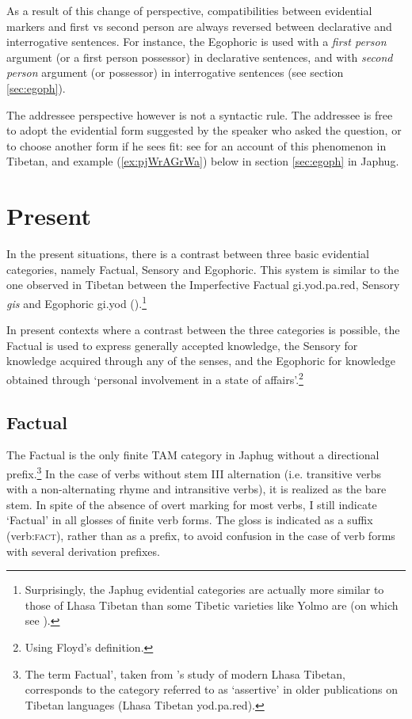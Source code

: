 \documentclass[oldfontcommands,oneside,a4paper,11pt]{article}
\newcommand{\ipa}[1]{{\phon \mbox{#1}}} %
\newcommand{\refb}[1]{(\ref{#1})}
\newcommand{\factual}[1]{\textsc{:fact}}
\begin{document}
As a result of this change of perspective, compatibilities between evidential markers and first vs second person are always reversed between declarative and interrogative sentences. For instance, the Egophoric is used with a \textit{first person} argument (or a first person possessor) in declarative sentences, and with \textit{second person} argument (or possessor) in interrogative sentences (see section \ref{sec:egoph}).

The addressee perspective however is not a syntactic rule. The addressee is free to adopt the evidential form suggested by the speaker who asked the question, or to choose another form if he sees fit: see \citealt{garrett07symbiosis} for an account of this phenomenon in Tibetan, and example
\refb{ex:pjWrAGrWa} below in section \ref{sec:egoph} in Japhug.

\section{Present} \label{sec:evd:prs}
In the present situations, there is a contrast between three basic evidential categories, namely Factual, Sensory and Egophoric. This system is similar to the one observed in Tibetan between the Imperfective Factual \ipa{gi.yod.pa.red}, Sensory \textit{gis} and Egophoric \ipa{gi.yod} (\citealt[295+]{tournadre08conjunct}).\footnote{Surprisingly, the Japhug evidential categories are actually more similar to those of Lhasa Tibetan than some Tibetic varieties like Yolmo are (on which see \citealt{gawne13copulas}).} 

In present contexts where a contrast between the three categories is possible, the Factual is used to express generally accepted knowledge, the Sensory for knowledge acquired through any of the senses, and the Egophoric for knowledge obtained through `personal involvement in a state of affairs'.\footnote{Using Floyd's \citeyearpar{floyd16egophoricity} definition.} 


\subsection{Factual} \label{sec:fact}

The Factual is the only finite TAM category in Japhug without a directional prefix.\footnote{The term Factual', taken from \citet{oisel13aux}'s study of modern Lhasa Tibetan, corresponds to the category referred to as `assertive' in older publications on Tibetan languages (Lhasa Tibetan \ipa{yod.pa.red}).} In the case of verbs without stem III alternation (i.e. transitive verbs with a non-alternating rhyme and intransitive verbs), it is realized as the bare stem. In spite of the absence of overt marking for most verbs, I still indicate `Factual' in all glosses of finite verb forms. The gloss is indicated as a suffix (verb\factual{}), rather than as a prefix, to avoid confusion in the case of verb forms with several derivation prefixes.
\end{document}
